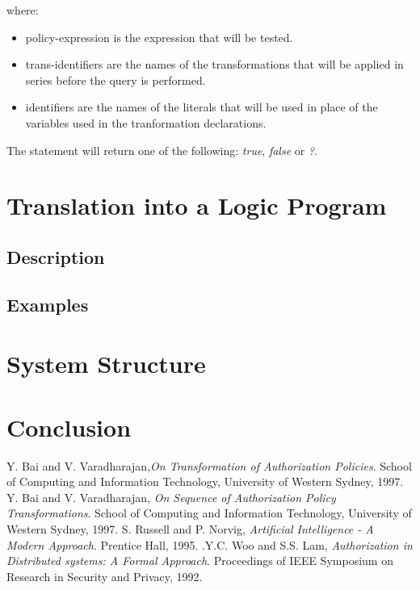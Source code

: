 \documentclass[a4paper]{article}
\begin{document}
        where:

        \begin{itemize}
          \item
            policy-expression is the expression that will be tested.
          \item
            trans-identifiers are the names of the transformations that will
            be applied in series before the query is performed.
          \item
            identifiers are the names of the literals that will be used in
            place of the variables used in the tranformation declarations.
        \end{itemize}

    The statement will return one of the following: \emph{true}, \emph{false}
    or \emph{?}.

    \pagebreak

  \section{Translation into a Logic Program}

    \subsection{Description}

    \subsection{Examples}

    \pagebreak

  \section{System Structure}

    \pagebreak

  \section{Conclusion}

    \pagebreak

  \begin{thebibliography}{}
    Y. Bai and V. Varadharajan,\emph{On Transformation of Authorization Policies}. School of Computing and Information Technology, University of Western Sydney, 1997.
    Y. Bai and V. Varadharajan, \emph{On Sequence of Authorization Policy Transformations}. School of Computing and Information Technology, University of Western Sydney, 1997.
    S. Russell and P. Norvig, \emph{Artificial Intelligence - A Modern Approach}. Prentice Hall, 1995.
    .Y.C. Woo and S.S. Lam, \emph{Authorization in Distributed systems: A Formal Approach}. Proceedings of IEEE Symposium on Research in Security and Privacy, 1992.
  \end{thebibliography}
\end{document}
